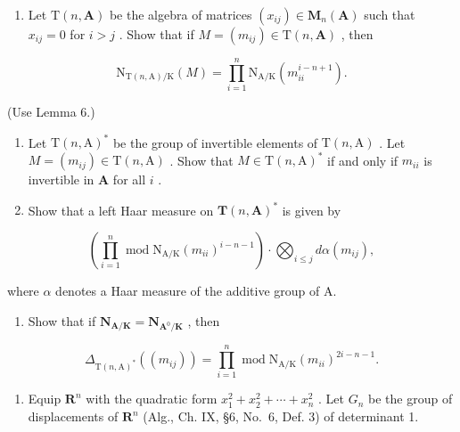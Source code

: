 \begin{enumerate}
\def\labelenumi{\alph{enumi})}
\tightlist
\item
  Let \(\mathrm{T}(n, \mathbf{A})\) be the algebra of matrices \((x_{ij}) \in \mathbf{M}_n(\mathbf{A})\) such that \(x_{ij} = 0\) for \(i > j\) . Show that if \(M = (m_{ij}) \in \mathrm{T}(n, \mathbf{A})\) , then
\end{enumerate}

\[
\mathrm{N} _ {\mathrm{T} (n, \mathrm{A}) / \mathrm{K}} (M) = \prod_ {i = 1} ^ {n} \mathrm{N} _ {\mathrm{A} / \mathrm{K}} (m _ {i i} ^ {i - n + 1}).
\]

(Use Lemma 6.)

\begin{enumerate}
\def\labelenumi{\alph{enumi})}
\setcounter{enumi}{1}
\item
  Let \(\mathrm{T}(n,\mathrm{A})^*\) be the group of invertible elements of \(\mathrm{T}(n,\mathrm{A})\) . Let \(M = (m_{ij}) \in \mathrm{T}(n,\mathrm{A})\) . Show that \(M \in \mathrm{T}(n,\mathrm{A})^*\) if and only if \(m_{ii}\) is invertible in \(\mathbf{A}\) for all \(i\) .
\item
  Show that a left Haar measure on \(\mathbf{T}(n,\mathbf{A})^{*}\) is given by
\end{enumerate}

\[
\left(\prod_ {i = 1} ^ {n} \operatorname{mod} \mathrm{N} _ {\mathrm{A} / \mathrm{K}} (m _ {i i}) ^ {i - n - 1}\right) \cdot \bigotimes_ {i \leqslant j} d \alpha (m _ {i j}),
\]

where \(\alpha\) denotes a Haar measure of the additive group of A.

\begin{enumerate}
\def\labelenumi{\alph{enumi})}
\setcounter{enumi}{3}
\tightlist
\item
  Show that if \(\mathbf{N}_{\mathbf{A} / \mathbf{K}} = \mathbf{N}_{\mathbf{A}^0 /\mathbf{K}}\) , then
\end{enumerate}

\[
\Delta_ {\mathrm{T} (n, \mathrm{A}) ^ {*}} \left(\left(m _ {i j}\right)\right) = \prod_ {i = 1} ^ {n} \operatorname{mod} \mathrm{N} _ {\mathrm{A} / \mathrm{K}} \left(m _ {i i}\right) ^ {2 i - n - 1}.
\]

\begin{enumerate}
\def\labelenumi{\arabic{enumi})}
\setcounter{enumi}{4}
\tightlist
\item
  Equip \(\mathbf{R}^{n}\) with the quadratic form \(x_{1}^{2} + x_{2}^{2} + \cdots + x_{n}^{2}\) . Let \(G_{n}\) be the group of displacements of \(\mathbf{R}^{n}\) (Alg., Ch. IX, §6, No.~6, Def. 3) of determinant 1.
\end{enumerate}

